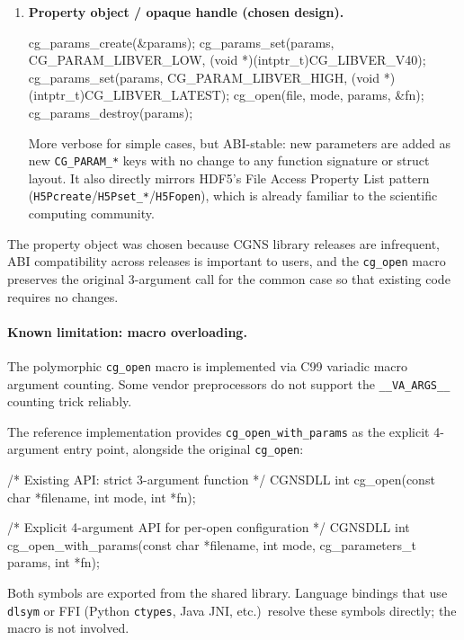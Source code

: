 \documentclass[11pt,letterpaper]{article}
\makeatletter
\let\cgns@orig@lstlisting\lstlisting
\let\cgns@endorig@lstlisting\endlstlisting
\renewenvironment{lstlisting}
  {\par\needspace{5\baselineskip}\nolinenumbers\cgns@orig@lstlisting}
  {\cgns@endorig@lstlisting\par\linenumbers}
\makeatother
\begin{document}
\begin{enumerate}[leftmargin=2em]
\item \textbf{Property object / opaque handle (chosen design).}
\begin{lstlisting}[language=C]
cg_params_create(&params);
cg_params_set(params, CG_PARAM_LIBVER_LOW,
              (void *)(intptr_t)CG_LIBVER_V40);
cg_params_set(params, CG_PARAM_LIBVER_HIGH,
              (void *)(intptr_t)CG_LIBVER_LATEST);
cg_open(file, mode, params, &fn);
cg_params_destroy(params);
\end{lstlisting}
More verbose for simple cases, but ABI-stable: new parameters are
added as new \texttt{CG\_PARAM\_*} keys with no change to any
function signature or struct layout.  It also directly mirrors HDF5's
File Access Property List pattern
(\texttt{H5Pcreate}/\texttt{H5Pset\_*}/\texttt{H5Fopen}), which is
already familiar to the scientific computing community.

\end{enumerate}

The property object was chosen because CGNS library releases are
infrequent, ABI compatibility across releases is important to users,
and the \texttt{cg\_open} macro preserves the original 3-argument
call for the common case so that existing code requires no changes.

\paragraph{Known limitation: macro overloading.}
The polymorphic \texttt{cg\_open} macro is implemented via C99
variadic macro argument counting.  Some vendor preprocessors do not
support the \texttt{\_\_VA\_ARGS\_\_} counting trick reliably.

The reference implementation provides
\texttt{cg\_open\_with\_params} as the explicit 4-argument entry
point, alongside the original \texttt{cg\_open}:

\begin{lstlisting}[language=C]
/* Existing API: strict 3-argument function */
CGNSDLL int cg_open(const char *filename, int mode, int *fn);

/* Explicit 4-argument API for per-open configuration */
CGNSDLL int cg_open_with_params(const char *filename, int mode,
                                cg_parameters_t params, int *fn);
\end{lstlisting}

Both symbols are exported from the shared library.
Language bindings that use \texttt{dlsym} or FFI (Python
\texttt{ctypes}, Java JNI, etc.)\ resolve these symbols directly;
the macro is not involved.
\end{document}
